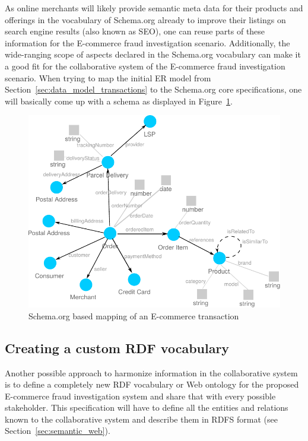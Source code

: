 As online merchants will likely provide semantic meta data for their products and offerings in the vocabulary of Schema.org already to improve their listings on search engine results (also known as \gls{SEO}), one can reuse parts of these information for the \gls{E-commerce} fraud investigation scenario. Additionally, the wide-ranging scope of aspects declared in the Schema.org vocabulary can make it a good fit for the collaborative system of the \gls{E-commerce} fraud investigation scenario. When trying to map the initial \gls{ER} model from Section~\ref{sec:data_model_transactions} to the Schema.org core specifications, one will basically come up with a schema as displayed in Figure~\ref{fig:images_schema_org}. \@

\begin{figure}[H]
	\centering
		\includegraphics[width=0.8\columnwidth]{images/schema_org_mapping.pdf}
	\caption{Schema.org based mapping of an \gls{E-commerce} transaction}
\label{fig:images_schema_org}
\end{figure}


\subsection{Creating a custom \gls{RDF} vocabulary}
\label{subsec:build_ontology_frauds}

Another possible approach to harmonize information in the collaborative system is to define a completely new \gls{RDF} vocabulary or Web ontology for the proposed \gls{E-commerce} fraud investigation system and share that with every possible stakeholder. This specification will have to define all the entities and relations known to the collaborative system and describe them in \gls{RDFS} format (see Section~\ref{sec:semantic_web}). \\

